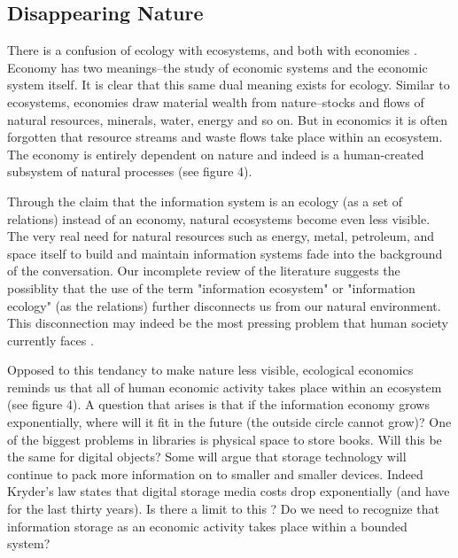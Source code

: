 \subsection{Disappearing Nature}

There is a confusion of ecology with ecosystems, and both with economies \citep[cf. ][]{lucas_2012,nardi_information_1999}. Economy has two meanings--the study of economic systems and the economic system itself. It is clear that this same dual meaning exists for ecology. Similar to ecosystems, economies draw material wealth from nature--stocks and flows of natural resources, minerals, water, energy and so on. But in economics it is often forgotten that resource streams and waste flows take place within an ecosystem. The economy is entirely dependent on nature and indeed is a human-created subsystem of natural processes (see figure 4).

Through the claim that the information system is an ecology (as a set of relations) instead of an economy, natural ecosystems become even less visible. The very real need for natural resources such as energy, metal, petroleum, and space itself to build and maintain information systems fade into the background of the conversation. Our incomplete review of the literature suggests the possiblity that the use of the term "information ecosystem" or "information ecology" (as the relations) further disconnects us from our natural environment.  This disconnection may indeed be the most pressing problem that human society currently faces \citep{worthy_2013}.

Opposed to this tendancy to make nature less visible, ecological economics reminds us that all of human economic activity takes place within an ecosystem (see figure 4).  A question that arises is that if the information economy grows exponentially, where will it fit in the future (the outside circle cannot grow)? One of the biggest problems in libraries is physical space to store books. Will this be the same for digital objects? Some will argue that storage technology will continue to pack more information on to smaller and smaller devices. Indeed Kryder's law states that digital storage media costs drop exponentially (and have for the last thirty years). Is there a limit to this \citep[cf.][]{rosenthal_2012}? Do we need to recognize that information storage as an economic activity takes place within a bounded system?

